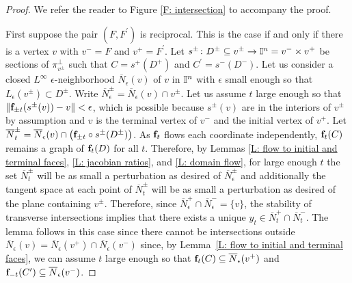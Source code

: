 \begin{proof}
	We refer the reader to Figure \ref{F: intersection} to accompany the proof.

	First suppose the pair $(F,F^\prime)$ is reciprocal.
	This is the case if and only if there is a vertex $v$ with $v^- = F$ and $v^+ = F^\prime$.
	Let $s^\pm \colon D^\pm \subseteq v^\pm \to \mathbb{I}^n = v^- \times v^+$ be sections of $\pi_{v^\pm}^\perp$ such that $C = s^+(D^+)$ and $C^\prime = s^-(D^-)$.	
	Let us consider a closed $L^\infty$ $\epsilon$-neighborhood $\overline N_\epsilon(v)$ of $v$ in $\mathbb{I}^n$ with $\epsilon$ small enough so that $L_\epsilon(v^\pm) \subset D^\pm$.
 	Write $\overline N_\epsilon^\pm = \overline N_\epsilon(v) \cap v^\pm$.
	Let us assume $t$ large enough so that $\Vert{\mathbf{f}_{\pm t}(s^\pm(v)) - v}\Vert < \epsilon$, which is possible because $s^\pm(v)$ are in the interiors of $v^\pm$ by assumption and $v$ is the terminal vertex of $v^-$ and the initial vertex of $v^+$.
	Let $\overline N_t^\pm = \overline N_\epsilon(v) \cap \big(\mathbf{f}_{\pm t}\circ s^\pm (D^\pm)\big)$. As $\mathbf{f}_t$ flows each coordinate independently, $\mathbf{f}_t(C)$ remains a graph of $\mathbf{f}_t(D)$ for all $t$. Therefore, by Lemmas \ref{L: flow to initial and terminal faces}, \ref{L: jacobian ratios}, and \ref{L: domain flow}, for large enough $t$ the set $\overline N_t^\pm$ will be as small a perturbation as desired of $\overline N_\epsilon^\pm$ and additionally the tangent space at each point of $\overline N_t^\pm$ will be as small a perturbation as desired of the plane containing $v^\pm$. 
	Therefore, since $\overline N_\epsilon^+ \cap \overline N_\epsilon^- = \{v\}$, the stability of transverse intersections implies that there exists a unique $y_t \in \overline N_t^+ \cap \overline N_t^-$. The lemma follows in this case since there cannot be intersections outside $\overline N_\epsilon(v) = \overline N_\epsilon(v^+) \cap \overline N_\epsilon(v^-)$ since, by Lemma~\ref{L: flow to initial and terminal faces}, we can assume $t$ large enough so that $\mathbf{f}_t(C) \subseteq \overline N_\epsilon(v^+)$ and $\mathbf{f}_{-t}(C^\prime) \subseteq \overline N_\epsilon(v^-)$.


\end{proof}
